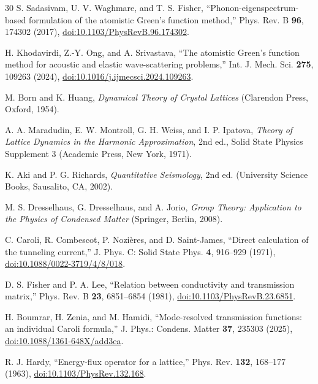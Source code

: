 \documentclass[10pt,aps,onecolumn,floatfix,notitlepage,nofootinbib,showkeys]{revtex4-2}
\begin{document}
\begin{thebibliography}{30}
S. Sadasivam, U. V. Waghmare, and T. S. Fisher,
``Phonon-eigenspectrum-based formulation of the atomistic Green's function method,''
Phys. Rev. B \textbf{96}, 174302 (2017),
\href{https://doi.org/10.1103/PhysRevB.96.174302}{doi:10.1103/PhysRevB.96.174302}.

H. Khodavirdi, Z.-Y. Ong, and A. Srivastava,
``The atomistic Green's function method for acoustic and elastic wave-scattering problems,''
Int. J. Mech. Sci. \textbf{275}, 109263 (2024),
\href{https://doi.org/10.1016/j.ijmecsci.2024.109263}{doi:10.1016/j.ijmecsci.2024.109263}.

M. Born and K. Huang,
\textit{Dynamical Theory of Crystal Lattices}
(Clarendon Press, Oxford, 1954).

A. A. Maradudin, E. W. Montroll, G. H. Weiss, and I. P. Ipatova,
\textit{Theory of Lattice Dynamics in the Harmonic Approximation},
2nd ed., Solid State Physics Supplement 3
(Academic Press, New York, 1971).

K. Aki and P. G. Richards,
\textit{Quantitative Seismology}, 2nd ed.
(University Science Books, Sausalito, CA, 2002).

M. S. Dresselhaus, G. Dresselhaus, and A. Jorio,
\textit{Group Theory: Application to the Physics of Condensed Matter}
(Springer, Berlin, 2008).

C. Caroli, R. Combescot, P. Nozi\`eres, and D. Saint-James,
``Direct calculation of the tunneling current,''
J. Phys. C: Solid State Phys. \textbf{4}, 916--929 (1971),
\href{https://doi.org/10.1088/0022-3719/4/8/018}{doi:10.1088/0022-3719/4/8/018}.

D. S. Fisher and P. A. Lee,
``Relation between conductivity and transmission matrix,''
Phys. Rev. B \textbf{23}, 6851--6854 (1981),
\href{https://doi.org/10.1103/PhysRevB.23.6851}{doi:10.1103/PhysRevB.23.6851}.

H. Boumrar, H. Zenia, and M. Hamidi,
``Mode-resolved transmission functions: an individual Caroli formula,''
J. Phys.: Condens. Matter \textbf{37}, 235303 (2025),
\href{https://doi.org/10.1088/1361-648X/add3ea}{doi:10.1088/1361-648X/add3ea}.

R. J. Hardy,
``Energy-flux operator for a lattice,''
Phys. Rev. \textbf{132}, 168--177 (1963),
\href{https://doi.org/10.1103/PhysRev.132.168}{doi:10.1103/PhysRev.132.168}.


\end{thebibliography}
\end{document}
